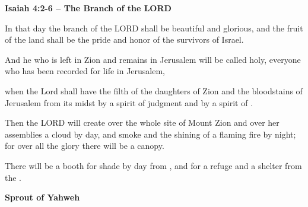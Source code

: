 \documentclass[11pt]{article}
\begin{document}
\begin{center}
{\Huge\bfseries Isaiah 4:2-6 – The Branch of the LORD}
\end{center}


{\vspace{3em}}


\begin{biblicaloutline}[Isaiah 4:2-6]


\begin{versesection}{2em}
 In that day the branch of the LORD shall be beautiful and glorious,
\poetryline and the fruit of the land shall be the pride and honor
\poetryline of the survivors of Israel.

 And he who is left in Zion and remains in Jerusalem will be called holy,
\poetryline everyone who has been recorded for life in Jerusalem,
\end{versesection}


\begin{versesection}{2em}
 when the Lord shall have  the filth of the daughters of Zion
\poetryline and  the bloodstains of Jerusalem from its midst
\poetryline by a spirit of judgment and by a spirit of .

 Then the LORD will create over the whole site of Mount Zion
\poetryline and over her assemblies
\poetryline a cloud by day, and smoke and the shining of a flaming fire by night;
\poetryline for over all the glory there will be a canopy.

 There will be a booth for shade by day from ,
\poetryline and for a refuge and a shelter from the .
\end{versesection}

\end{biblicaloutline}

\vspace{3em}
{\large\bfseries Sprout of Yahweh}
\vspace{1em}

\end{document}
